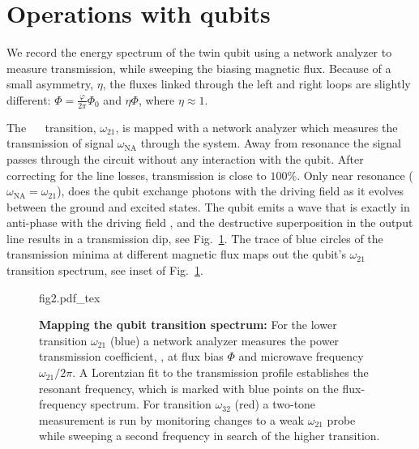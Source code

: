 
\section{Operations with qubits}
\label{sec:characterisation}


\noindent  We record  the energy  spectrum  of the  twin qubit  using a  network
analyzer to measure transmission,  while  sweeping  the  biasing  magnetic flux.   Because  of  a  small
asymmetry, $\eta$, the fluxes linked through  the left and right loops are slightly
different: $ \Phi = \frac{\varphi}{2\pi}\Phi_0$ and $ \eta\Phi $, where $\eta\approx1$.

The  ~\ilra~  transition, $\omega_{21}$,  is  mapped  with a  network
analyzer which measures  the transmission of signal  $\omega_{\text{NA}}$ through the
system.  Away from  resonance the signal passes through the  circuit without any
interaction with the qubit.  After  correcting for the line losses, transmission
is close to  $ 100\% $.  Only near resonance  ($\omega_{\text{NA}}=\omega_{21}$), does the
qubit exchange photons  with the driving field as it  evolves between the ground
and excited states.  The  qubit emits a wave that is  exactly in anti-phase with
the driving  field \cite{abdumalikov2010}, and the  destructive superposition in
the output line results in  a transmission dip, see Fig.~\ref{fig:transmission}.
The trace of blue circles of  the transmission minima at different magnetic flux
maps   out   the   qubit's   $\omega_{21}$  transition   spectrum,   see   inset   of
Fig.~\ref{fig:transmission}.

\begin{figure}[h]
  \centering\def\svgwidth{9.5cm}{fig2.pdf_tex}
  \caption{\small \textbf{Mapping  the qubit transition  spectrum:}  For the  lower transition
    $\omega_{21}$ (blue) a  network analyzer measures  the power  transmission coefficient,
    , at flux  bias $ \Phi $  and microwave frequency $  \omega_{21}/2\pi$.  A Lorentzian
    fit \cite{Astafiev2010}  to the transmission  profile establishes the  resonant frequency,
    which  is  marked  with  blue  points on  the  flux-frequency  spectrum.   For  transition
    $\omega_{32}$  (red)  a two-tone  measurement is  run by  monitoring changes  to a  weak
    $\omega_{21}$ probe while sweeping a second frequency  in search of the higher transition.
  }
  \label{fig:transmission}
\end{figure}

